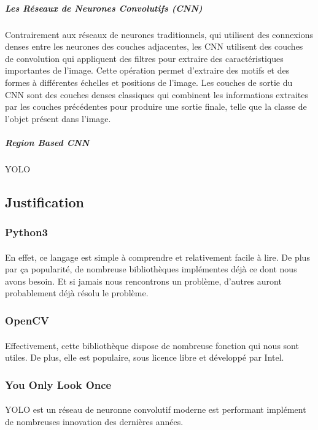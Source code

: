 \documentclass[a4paper]{article}
\begin{document}
					\subparagraph{Les Réseaux de Neurones Convolutifs (CNN)} 
					Contrairement aux réseaux de neurones traditionnels, qui utilisent des connexions denses entre les neurones des couches adjacentes, les CNN utilisent des couches de convolution qui appliquent des filtres pour extraire des caractéristiques importantes de l'image.
					Cette opération permet d'extraire des motifs et des formes à différentes échelles et positions de l'image.
					Les couches de sortie du CNN sont des couches denses classiques qui combinent les informations extraites par les couches précédentes pour produire une sortie finale, telle que la classe de l'objet présent dans l'image.
					\subparagraph{Region Based CNN}


					\subparagraph{} YOLO 

		\subsection*{Justification}
			\subsubsection*{Python3}
				\paragraph{} En effet, ce langage est simple à comprendre et relativement facile à lire. De plus par ça popularité, de nombreuse bibliothèques implémentes déjà ce dont nous avons besoin. Et si jamais nous rencontrons un problème, d'autres auront probablement déjà résolu le problème.
			\subsubsection*{OpenCV}
				\paragraph{} Effectivement, cette bibliothèque dispose de nombreuse fonction qui nous sont utiles. De plus, elle est populaire, sous licence libre et développé par Intel.
			\subsubsection*{You Only Look Once}
				\paragraph{} YOLO est un réseau de neuronne convolutif moderne est performant implément de nombreuses innovation des dernières années.
	\newpage
\end{document}

